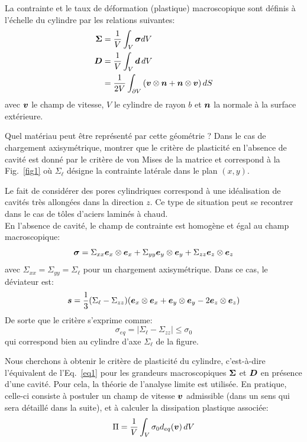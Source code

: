 \documentclass[french,12pt]{exam}
\begin{document}
La contrainte et le taux de déformation (plastique) macroscopique sont définis à l'échelle du cylindre par les relations suivantes:
\begin{align}
  \boldsymbol{\Sigma} &= \frac{1}{V} \int_V \boldsymbol{\sigma} dV\\
  \boldsymbol{D} &= \frac{1}{V} \int_V \boldsymbol{d} \, dV \\
  &= \frac{1}{2V} \int_{\partial V} \left(\boldsymbol{v} \otimes \boldsymbol{n} + \boldsymbol{n} \otimes \boldsymbol{v}     \right) dS \label{eq:D-v-n}
\end{align}
avec $\boldsymbol{v}$ le champ de vitesse, $V$ le cylindre de rayon $b$ et $\boldsymbol{n}$ la normale à la surface extérieure.\\


\begin{questions}
\question Quel matériau peut être représenté par cette géométrie ? Dans le cas de chargement axisymétrique, montrer que le critère de plasticité en l'absence de cavité est donné par le critère de von Mises de la matrice et correspond à la Fig.~\ref{fig1} où $\Sigma_\ell$ désigne la contrainte latérale dans le plan $(x,y)$.\\
\end{questions}

\begin{solution}
Le fait de considérer des pores cylindriques correspond à une idéalisation de cavités très allongées dans la direction $z$. Ce type de situation peut se recontrer dans le cas de tôles d'aciers laminés à chaud.\\

En l'absence de cavité, le champ de contrainte est homogène et égal au champ macroscopique:
$$\boldsymbol{\sigma} = \Sigma_{xx}\boldsymbol{e}_x\otimes\boldsymbol{e}_x + \Sigma_{yy}\boldsymbol{e}_y\otimes\boldsymbol{e}_y +  \Sigma_{zz}\boldsymbol{e}_z\otimes\boldsymbol{e}_z$$
avec $\Sigma_{xx}=\Sigma_{yy}=\Sigma_\ell$ pour un chargement axisymétrique. Dans ce cas, le déviateur est:
$$\boldsymbol{s} = \dfrac{1}{3}(\Sigma_{\ell}-\Sigma_{zz})(\boldsymbol{e}_x\otimes\boldsymbol{e}_x + \boldsymbol{e}_y\otimes\boldsymbol{e}_y - 2\boldsymbol{e}_z\otimes\boldsymbol{e}_z)$$
De sorte que le critère s'exprime comme:
$$\sigma_{eq} = |\Sigma_\ell - \Sigma_{zz}| \leq \sigma_0$$
qui correspond bien au cylindre d'axe $\Sigma_{\ell}$ de la figure.
\end{solution}


Nous cherchons à obtenir le critère de plasticité du cylindre, c'est-à-dire l'équivalent de l'Eq.~\ref{eq1} pour les grandeurs macroscopiques $\boldsymbol{\Sigma}$ et $\boldsymbol{D}$ en présence d'une cavité. Pour cela, la théorie de l'analyse limite est utilisée. En pratique, celle-ci consiste à postuler un champ de vitesse $\boldsymbol{v}$ admissible (dans un sens qui sera détaillé dans la suite), et à calculer la dissipation plastique associée:
\begin{equation}
  \Pi = \frac{1}{V} \int_V \sigma_0 d_{eq}(\boldsymbol{v}) \,dV
  \label{eq3}
\end{equation}
\end{document}
